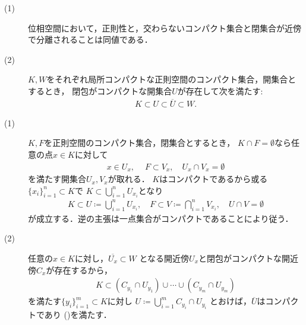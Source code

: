 	\begin{screen}
		\begin{thm}[正則空間とは交わらないコンパクト集合と閉集合が近傍で分離できる空間]
		\label{thm:each_point_in_regular_space_has_closesd_local_base}\mbox{}
			\begin{description}
				\item[(1)] 位相空間において，正則性と，交わらないコンパクト集合と閉集合が近傍で分離されることは同値である．
					
				\item[(2)]
					$K,W$をそれぞれ局所コンパクトな正則空間のコンパクト集合，開集合とするとき，
					閉包がコンパクトな開集合$U$が存在して次を満たす:
					\begin{align}
						K \subset U \subset \overline{U} \subset W.
						\label{eq:thm_each_point_in_regular_space_has_closesd_local_base}
					\end{align}
			\end{description}
		\end{thm}
	\end{screen}
	
	\begin{prf}\mbox{}
		\begin{description}
			\item[(1)]
				$K,F$を正則空間のコンパクト集合，閉集合とするとき，
				$K \cap F = \emptyset$なら任意の点$x \in K$に対して
				\begin{align}
					x \in U_x,\ \quad F \subset V_x,
					\quad U_x \cap V_x = \emptyset
				\end{align}
				を満たす開集合$U_x,V_x$が取れる．
				$K$はコンパクトであるから或る$\{x_i\}_{i=1}^n \subset K$で
				$K \subset \bigcup_{i=1}^n U_{x_i}$となり
				\begin{align}
					K \subset U \coloneqq \bigcup_{i=1}^n U_{x_i},
					\quad F \subset V \coloneqq \bigcap_{i=1}^n V_{x_i},
					\quad U \cap V = \emptyset
				\end{align}
				が成立する．逆の主張は一点集合がコンパクトであることにより従う．
			\item[(2)]
				任意の$x \in K$に対し，$\overline{U_x} \subset W$
				となる開近傍$U_x$と閉包がコンパクトな開近傍$C_x$が存在するから，
				\begin{align}
					K \subset (C_{y_1} \cap U_{y_1}) \cup \cdots \cup (C_{y_m} \cap U_{y_m})
				\end{align}
				を満たす$\{y_i\}_{i=1}^m \subset K$に対し
				$U \coloneqq \bigcup_{i=1}^m C_{y_i} \cap U_{y_i}$
				とおけば，$\overline{U}$はコンパクトであり
				()を満たす．
				\QED
		\end{description}
	\end{prf}
	
